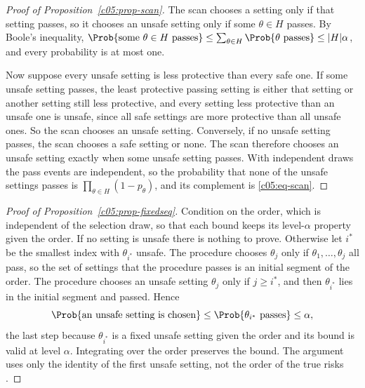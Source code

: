 \begin{proof}[Proof of Proposition~\ref{c05:prop-scan}]
The scan chooses a setting only if that setting passes, so it chooses an unsafe setting
only if some $\theta \in H$ passes. By Boole's inequality,
$\Prob\{\text{some } \theta \in H \text{ passes}\} \le \sum_{\theta\in H}\Prob\{\theta
\text{ passes}\} \le |H|\alpha$, and every probability is at most one.

Now suppose every unsafe setting is less protective than every safe one. If some unsafe
setting passes, the least protective passing setting is either that setting or another
setting still less protective, and every setting less protective than an unsafe one is
unsafe, since all safe settings are more protective than all unsafe ones. So the scan
chooses an unsafe setting. Conversely, if no unsafe setting passes, the scan chooses a
safe setting or none. The scan therefore chooses an unsafe setting exactly when some
unsafe setting passes. With independent draws the pass events are independent, so the
probability that none of the unsafe settings passes is $\prod_{\theta\in H}(1-p_\theta)$,
and its complement is \eqref{c05:eq-scan}.
\end{proof}

\begin{proof}[Proof of Proposition~\ref{c05:prop-fixedseq}]
Condition on the order, which is independent of the selection draw, so that each bound
keeps its level-$\alpha$ property given the order. If no setting is unsafe there is
nothing to prove. Otherwise let $i^\ast$ be the smallest index with $\theta_{i^\ast}$
unsafe. The procedure chooses $\theta_j$ only if $\theta_1, \dots, \theta_j$ all pass,
so the set of settings that the procedure passes is an initial segment of the order. The
procedure chooses an unsafe setting $\theta_j$ only if $j \ge i^\ast$, and then
$\theta_{i^\ast}$ lies in the initial segment and passed. Hence
\[
\Prob\{\text{an unsafe setting is chosen}\} \le
\Prob\{\theta_{i^\ast}\text{ passes}\} \le \alpha,
\]
the last step because $\theta_{i^\ast}$ is a fixed unsafe setting given the order and its
bound is valid at level $\alpha$. Integrating over the order preserves the bound. The
argument uses only the identity of the first unsafe setting, not the order of the true
risks \citep{maurer1995}.
\end{proof}

